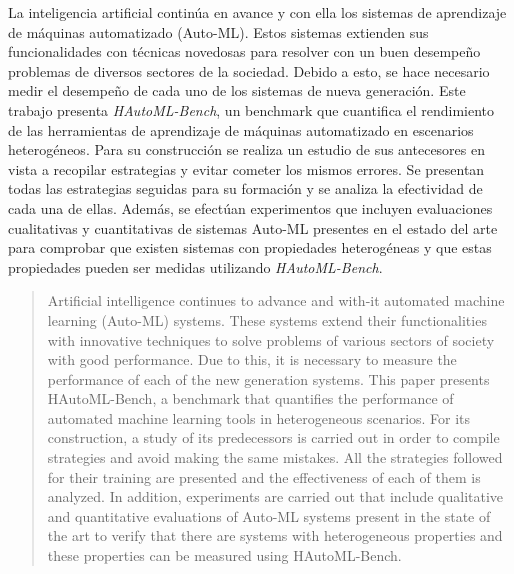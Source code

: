 \begin{resumen}
La inteligencia artificial continúa en avance y con ella los sistemas de aprendizaje de máquinas automatizado (Auto-ML). 
Estos sistemas extienden sus funcionalidades con técnicas novedosas para resolver con un buen desempeño problemas de diversos 
sectores de la sociedad. Debido a esto, se hace necesario medir el desempeño de cada uno de los sistemas de nueva 
generación. Este trabajo presenta \textit{HAutoML-Bench}, un benchmark que cuantifica el rendimiento de las herramientas de 
aprendizaje de máquinas automatizado en escenarios heterogéneos. Para su construcción se realiza un estudio de sus antecesores
en vista a recopilar estrategias y evitar cometer los mismos errores. Se presentan todas las estrategias seguidas para su formación y se analiza la 
efectividad de cada una de ellas. 
Además, se efectúan experimentos que incluyen evaluaciones cualitativas y cuantitativas de sistemas Auto-ML presentes en el 
estado del arte para comprobar que existen sistemas con propiedades heterogéneas y que estas propiedades pueden ser medidas utilizando \textit{HAutoML-Bench}.

\end{resumen}

\begin{abstract}
Artificial intelligence continues to advance and with-it automated machine learning (Auto-ML) systems. 
These systems extend their functionalities with innovative techniques to solve problems of various 
sectors of society with good performance. Due to this, it is necessary to measure the performance of 
each of the new generation systems. This paper presents HAutoML-Bench, a benchmark that quantifies 
the performance of automated machine learning tools in heterogeneous scenarios. For its construction, 
a study of its predecessors is carried out in order to compile strategies and avoid making the same 
mistakes. All the strategies followed for their training are presented and the effectiveness of each of 
them is analyzed. In addition, experiments are carried out that include qualitative and quantitative 
evaluations of Auto-ML systems present in the state of the art to verify that there are systems with 
heterogeneous properties and these properties can be measured using HAutoML-Bench.
\end{abstract}